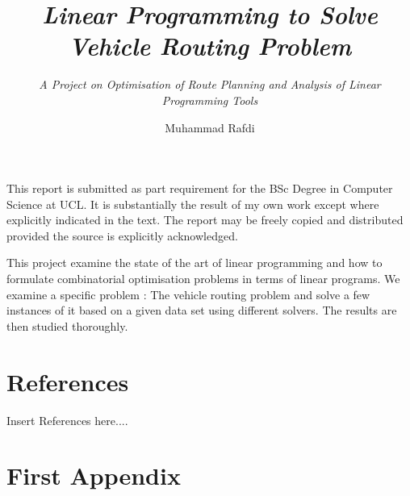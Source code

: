 \documentclass[a4paper,12pt,numbered,print,index]{report/thesisFormat}
\title{\textit{Linear Programming to Solve\\Vehicle Routing Problem}}
\subtitle{\textit{A Project on Optimisation of Route Planning and Analysis of Linear Programming Tools}}
\author{Muhammad Rafdi}
\newenvironment{romanpages}{
  \setcounter{page}{1}
  \renewcommand{\thepage}{\roman{page}}}
{\newpage\renewcommand{\thepage}{\arabic{page}}}
\begin{document}
\begin{romanpages}

\begin{titlepage}
  \maketitle
\end{titlepage}

\begin{declaration}

This report is submitted as part requirement for the BSc Degree in Computer Science at UCL. It is substantially
the result of my own work except where explicitly indicated in the text. The report may be freely copied and
distributed provided the source is explicitly acknowledged.

\end{declaration}


\begin{abstract2}

   This project examine the state of the art of linear programming and how to formulate combinatorial optimisation
   problems in terms of linear programs. We examine a specific problem : The vehicle routing problem and solve a
   few instances of it based on a given data set using different solvers. The results are then studied thoroughly.

\end{abstract2}


\setcounter{page}{1}

\tableofcontents

\listoffigures

\listoftables

\end{romanpages}













\chapter{References}
Insert References here....

\appendix
\chapter{First Appendix}
\end{document}
